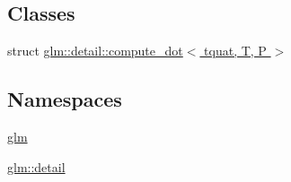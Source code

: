\subsection*{Classes}
\begin{DoxyCompactItemize}
\item 
struct \hyperlink{structglm_1_1detail_1_1compute__dot_3_01tquat_00_01_t_00_01_p_01_4}{glm\+::detail\+::compute\+\_\+dot$<$ tquat, T, P $>$}
\end{DoxyCompactItemize}
\subsection*{Namespaces}
\begin{DoxyCompactItemize}
\item 
 \hyperlink{namespaceglm}{glm}
\item 
 \hyperlink{namespaceglm_1_1detail}{glm\+::detail}
\end{DoxyCompactItemize}
